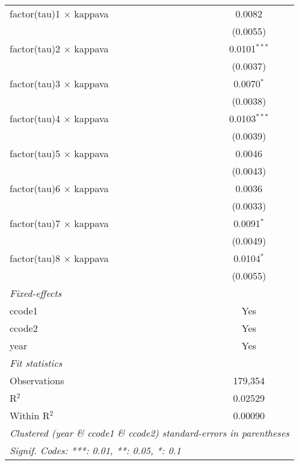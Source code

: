 \begin{tabular}{lc}
   factor(tau)1 $\times$ kappava   & 0.0082\\   
                                   & (0.0055)\\   
   factor(tau)2 $\times$ kappava   & 0.0101$^{***}$\\   
                                   & (0.0037)\\   
   factor(tau)3 $\times$ kappava   & 0.0070$^{*}$\\   
                                   & (0.0038)\\   
   factor(tau)4 $\times$ kappava   & 0.0103$^{***}$\\   
                                   & (0.0039)\\   
   factor(tau)5 $\times$ kappava   & 0.0046\\   
                                   & (0.0043)\\   
   factor(tau)6 $\times$ kappava   & 0.0036\\   
                                   & (0.0033)\\   
   factor(tau)7 $\times$ kappava   & 0.0091$^{*}$\\   
                                   & (0.0049)\\   
   factor(tau)8 $\times$ kappava   & 0.0104$^{*}$\\   
                                   & (0.0055)\\   
   \midrule
   \emph{Fixed-effects}\\
   ccode1                          & Yes\\  
   ccode2                          & Yes\\  
   year                            & Yes\\  
   \midrule
   \emph{Fit statistics}\\
   Observations                    & 179,354\\  
   R$^2$                           & 0.02529\\  
   Within R$^2$                    & 0.00090\\  
   \midrule \midrule
   \multicolumn{2}{l}{\emph{Clustered (year \& ccode1 \& ccode2) standard-errors in parentheses}}\\
   \multicolumn{2}{l}{\emph{Signif. Codes: ***: 0.01, **: 0.05, *: 0.1}}\\
\end{tabular}
\par\endgroup


